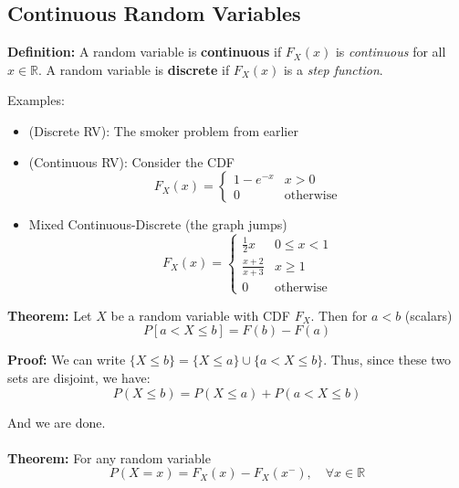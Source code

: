 \documentclass{article}
\begin{document}
\subsection{Continuous Random Variables}

\textbf{Definition:} A random variable is \textbf{continuous} if $F_X(x)$ is \textit{continuous} for all $x \in \mathbb{R}$. A random variable is \textbf{discrete} if $F_X(x)$ is a \textit{step function}.

Examples: 
\begin{itemize}
    \item (Discrete RV): The smoker problem from earlier
    \item (Continuous RV): Consider the CDF
    \begin{equation*}
      F_X(x) = \begin{cases}
            1 - e^{-x} & x > 0\\
            0 & \text{otherwise}
        \end{cases}
    \end{equation*}
    
    \item Mixed Continuous-Discrete (the graph jumps)
    \begin{equation*}
      F_X(x) = \begin{cases}
            \frac{1}{2}x & 0 \leq x < 1\\
            \frac{x + 2}{x + 3} & x\geq 1 \\
            0 & \text{otherwise}
        \end{cases}
    \end{equation*}
\end{itemize}

\noindent\textbf{Theorem:} Let $X$ be a random variable with CDF $F_X$. Then for $a<b$ (scalars)
\begin{equation*}
    P\left[a< X \leq b\right] = F(b) - F(a)
\end{equation*}

\noindent\textbf{Proof:} We can write $\{X \leq b\} = \{X \leq a\} \cup \{a < X \leq b\}$. Thus, since these two sets are disjoint, we have:
\begin{equation*}
    P(X\leq b) = P(X \leq a) + P(a < X \leq b)
\end{equation*}

And we are done.
\\~\\
\noindent \textbf{Theorem:} For any random variable
\begin{equation*}
    P(X=x) = F_X(x) - F_X(x^-), \quad \forall x \in \mathbb{R}
\end{equation*}
\end{document}
